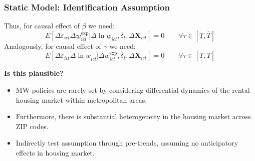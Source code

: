 \begin{frame}
	\frametitle{Static Model: Identification Assumption}
	
	Thus, for causal effect of $\beta$ we need:
	$$
	E \left[\Delta \varepsilon_{ict} \Delta \underline{w}^{\text{exp}}_{ict}  
	\big| \Delta \ln \underline{w}_{ict}, \delta_t, \Delta 
	\mathbf{X}_{ict} \right] = 0
	\quad \quad \forall \tau \in \left[ \underline{T}, \overline{T} \right]
	$$
	\vspace{.5mm}
	Analogously, for causal effect of $\gamma$ we need:
	$$
	E \left[\Delta \varepsilon_{ict} \Delta \ln \underline{w}_{ict}  
	\big| \Delta \underline{w}^{\text{exp}}_{ict}, \delta_t, \Delta \mathbf{X}_{ict} 
	\right] = 0
	\quad \quad \forall \tau \in \left[ \underline{T}, \overline{T} \right]
	$$
	
	\pause
	\vspace{.5mm}
	\textbf{Is this plausible?}
	\begin{itemize} \small
		\vspace{.5mm}
		\item MW policies are rarely set by considering differential dynamics of the 
		rental housing market within metropolitan areas.
		
		\vspace{.5mm}
		\item Furthermore, there is substantial heterogeneity in the housing market 
		across ZIP codes.
		
		\vspace{.5mm}
		\item Indirectly test assumption through pre-trends, assuming no anticipatory 
		effects in housing market.
	\end{itemize}
\end{frame}

